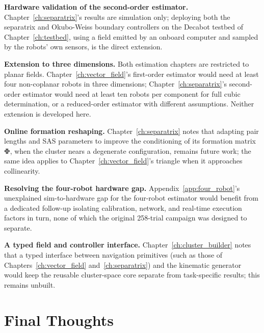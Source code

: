 \documentclass[12pt, letterpaper, oneside]{report}
\begin{document}
\textbf{Hardware validation of the second-order estimator.}
Chapter~\ref{ch:separatrix}'s results are simulation only; deploying
both the separatrix and Okubo-Weiss boundary controllers on the Decabot
testbed of Chapter~\ref{ch:testbed}, using a field emitted by an
onboard computer and sampled by the robots' own sensors, is the direct
extension.

\textbf{Extension to three dimensions.} Both estimation chapters are
restricted to planar fields. Chapter~\ref{ch:vector_field}'s first-order
estimator would need at least four non-coplanar robots in three
dimensions; Chapter~\ref{ch:separatrix}'s second-order estimator would
need at least ten robots per component for full cubic determination, or
a reduced-order estimator with different assumptions. Neither extension
is developed here.

\textbf{Online formation reshaping.} Chapter~\ref{ch:separatrix} notes
that adapting pair lengths and SAS parameters to improve the
conditioning of its formation matrix $\boldsymbol{\Phi}$, when the
cluster nears a degenerate configuration, remains future work; the same
idea applies to Chapter~\ref{ch:vector_field}'s triangle when it
approaches collinearity.

\textbf{Resolving the four-robot hardware gap.} Appendix~\ref{app:four_robot}'s
unexplained sim-to-hardware gap for the four-robot estimator would
benefit from a dedicated follow-up isolating calibration, network, and
real-time execution factors in turn, none of which the original
258-trial campaign was designed to separate.

\textbf{A typed field and controller interface.} Chapter~\ref{ch:cluster_builder}
notes that a typed interface between navigation primitives (such as
those of Chapters~\ref{ch:vector_field} and~\ref{ch:separatrix}) and the
kinematic generator would keep the reusable cluster-space core separate
from task-specific results; this remains unbuilt.

\section{Final Thoughts}
\end{document}
